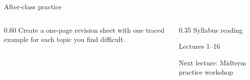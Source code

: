 \documentclass[10pt,aspectratio=169]{beamer}
\begin{document}
\begin{frame}[fragile,t]{After-class practice}
\begin{columns}[T,onlytextwidth]\begin{column}{0.60\textwidth}
Create a one-page revision sheet with one traced example for each topic you find difficult.
\end{column}\begin{column}{0.35\textwidth}\small
Syllabus reading\par Lectures 1--16

Next lecture: Midterm practice workshop
\end{column}\end{columns}
\end{frame}
\end{document}
